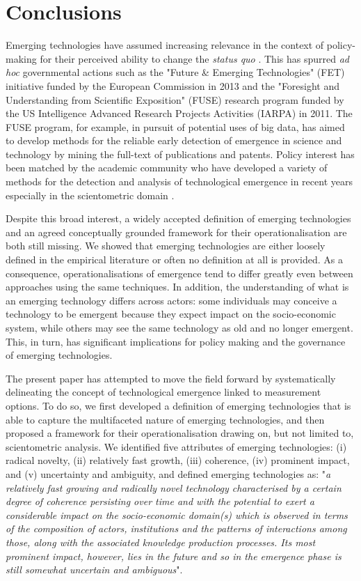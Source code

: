 \documentclass[11pt]{article}
\begin{document}
\section{Conclusions}
Emerging technologies have assumed increasing relevance in the context of policy-making for their perceived ability to change the \textit{status quo} \citep[e.g.][]{Martin1995,Day2000,Alexander2012,Cozzens2010}. This has spurred \textit{ad hoc} governmental actions such as the "Future \& Emerging Technologies" (FET) initiative funded by the European Commission in 2013 and the "Foresight and Understanding from Scientific Exposition" (FUSE) research program funded by the US Intelligence Advanced Research Projects Activities (IARPA) in 2011. The FUSE program, for example, in pursuit of potential uses of big data, has aimed to develop methods for the reliable early detection of emergence in science and technology by mining the full-text of publications and patents. Policy interest has been matched by the academic community who have developed a variety of methods for the detection and analysis of technological emergence in recent years especially in the scientometric domain \citep[e.g.][]{Small2014,Glanzel2012}.

Despite this broad interest, a widely accepted definition of emerging technologies and an agreed conceptually grounded framework for their operationalisation are both still missing. We showed that emerging technologies are either loosely defined in the empirical literature or often no definition at all is provided. As a consequence, operationalisations of emergence tend to differ greatly even between approaches using the same techniques. In addition, the understanding of what is an emerging technology differs across actors: some individuals may conceive a technology to be emergent because they expect impact on the socio-economic system, while others may see the same technology as old and no longer emergent. This, in turn, has significant implications for policy making and the governance of emerging technologies.

The present paper has attempted to move the field forward by systematically delineating the concept of technological emergence linked to measurement options. To do so, we first developed a definition of emerging technologies that is able to capture the multifaceted nature of emerging technologies, and then proposed a framework for their operationalisation drawing on, but not limited to, scientometric analysis. We identified five attributes of emerging technologies: (i) radical novelty, (ii) relatively fast growth, (iii) coherence, (iv) prominent impact, and (v) uncertainty and ambiguity, and defined emerging technologies as: "\textit{a relatively fast growing and radically novel technology characterised by a certain degree of coherence persisting over time and with the potential to exert a considerable impact on the socio-economic domain(s) which is observed in terms of the composition of actors, institutions and the patterns of interactions among those, along with the associated knowledge production processes. Its most prominent impact, however, lies in the future and so in the emergence phase is still somewhat uncertain and ambiguous}". 
\end{document}
